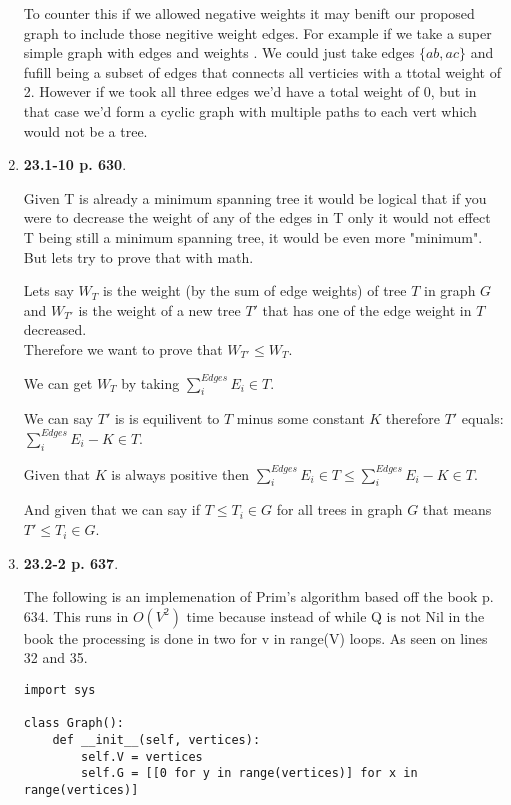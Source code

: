 \documentclass{article}
\begin{document}
\begin{enumerate}
    To counter this if we allowed negative weights it may benift our proposed graph to include those negitive weight edges. For example if we take a super simple graph with edges  and weights .
    We could just take edges $\{ab, ac\}$ and fufill being a subset of edges that connects all verticies with a ttotal weight of 2. However if we took all three edges we'd have a total weight of 0, but in that case we'd form a cyclic graph with multiple paths to each vert which would not be a tree.

    \item \textbf{23.1-10 p. 630}.
    
    Given T is already a minimum spanning tree it would be logical that if you were to decrease the weight of any of the edges in T only it would not effect T being still a minimum spanning tree, it would be even more "minimum". 
    But lets try to prove that with math. 

    Lets say $W_T$ is the weight (by the sum of edge weights) of tree $T$ in graph $G$ and $W_{T'}$ is the weight of a new tree $T'$ that has one of the edge weight in $T$ decreased.\\

    Therefore we want to prove that $W_{T'} \leq W_T$. 

    We can get $W_T$ by taking $\sum_{i}^{Edges} E_i \in T$.

    We can say $T'$ is is equilivent to $T$ minus some constant $K$ therefore $T'$ equals: $\sum_{i}^{Edges} E_i - K \in T$.

    Given that $K$ is always positive then $\sum_{i}^{Edges} E_i \in T \leq \sum_{i}^{Edges} E_i - K \in T$.

    And given that we can say if $T \leq T_i \in G$ for all trees in graph $G$ that means $T' \leq T_i \in G$.

    \item \textbf{23.2-2 p. 637}. 
    
    The following is an implemenation of Prim's algorithm based off the book p. 634. 
    This runs in $O(V^2)$ time because instead of while Q is not Nil in the book the processing is done in two for v in range(V) loops.
    As seen on lines 32 and 35. 

    \begin{lstlisting}
import sys

class Graph(): 
    def __init__(self, vertices): 
        self.V = vertices 
        self.G = [[0 for y in range(vertices)] for x in range(vertices)] 


\end{lstlisting}
\end{enumerate}
\end{document}
